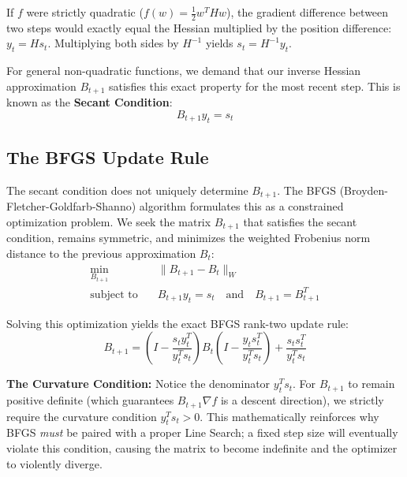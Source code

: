 If $f$ were strictly quadratic ($f(w) = \frac{1}{2}w^T H w$), the gradient difference between two steps would exactly equal the Hessian multiplied by the position difference: $y_t = H s_t$. Multiplying both sides by $H^{-1}$ yields $s_t = H^{-1} y_t$. 

For general non-quadratic functions, we demand that our inverse Hessian approximation $B_{t+1}$ satisfies this exact property for the most recent step. This is known as the \textbf{Secant Condition}:
\begin{equation}
    B_{t+1} y_t = s_t
\end{equation}

\subsection{The BFGS Update Rule}
The secant condition does not uniquely determine $B_{t+1}$. The BFGS (Broyden-Fletcher-Goldfarb-Shanno) algorithm \cite{nocedal2006numerical} formulates this as a constrained optimization problem. We seek the matrix $B_{t+1}$ that satisfies the secant condition, remains symmetric, and minimizes the weighted Frobenius norm distance to the previous approximation $B_t$:
\begin{align*}
    \min_{B_{t+1}} \quad & \| B_{t+1} - B_t \|_W \\
    \text{subject to} \quad & B_{t+1} y_t = s_t \quad \text{and} \quad B_{t+1} = B_{t+1}^T
\end{align*}

Solving this optimization yields the exact BFGS rank-two update rule:
\begin{equation}
    B_{t+1} = \left( I - \frac{s_t y_t^T}{y_t^T s_t} \right) B_t \left( I - \frac{y_t s_t^T}{y_t^T s_t} \right) + \frac{s_t s_t^T}{y_t^T s_t}
\end{equation}

\textbf{The Curvature Condition:} Notice the denominator $y_t^T s_t$. For $B_{t+1}$ to remain positive definite (which guarantees $B_{t+1} \nabla f$ is a descent direction), we strictly require the curvature condition $y_t^T s_t > 0$. This mathematically reinforces why BFGS \textit{must} be paired with a proper Line Search; a fixed step size will eventually violate this condition, causing the matrix to become indefinite and the optimizer to violently diverge.
